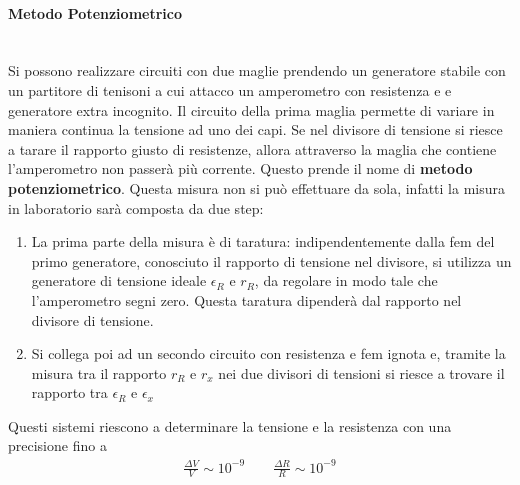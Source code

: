 \documentclass[a4paper, oneside]{article}
\begin{document}
\paragraph{Metodo Potenziometrico} \mbox{} \\
Si possono realizzare circuiti con due maglie prendendo un generatore stabile con 
un partitore di tenisoni a cui attacco un amperometro con resistenza e e generatore extra incognito.
Il circuito della prima maglia permette di variare in maniera continua la tensione 
ad uno dei capi. Se nel divisore di tensione si riesce a tarare il rapporto giusto di resistenze, allora
attraverso la maglia che contiene l'amperometro non passerà più corrente. Questo 
prende il nome di \textbf{metodo potenziometrico}. Questa misura non si può effettuare 
da sola, infatti la misura in laboratorio sarà composta da due step:
\begin{enumerate}
    \item  La prima parte della misura è di taratura: indipendentemente dalla
    fem del primo generatore, conosciuto il rapporto di tensione nel divisore, si utilizza
    un generatore di tensione ideale $\epsilon_R$ e $r_R$, da regolare in modo tale che l'amperometro segni zero.
    Questa taratura dipenderà dal rapporto nel divisore di tensione. 
    \item Si collega poi ad un secondo circuito con resistenza
    e fem ignota e, tramite la misura tra il rapporto $r_R$ e $r_x$ nei 
    due divisori di tensioni si riesce a trovare il rapporto tra $\epsilon_R$ e $\epsilon_x$
\end{enumerate}
Questi sistemi riescono a determinare la tensione e la resistenza con una precisione 
fino a
\begin{gather*}
    \frac{\Delta V}{V} \sim 10^{-9} \qquad \frac{\Delta R}{R} \sim 10^{-9}
\end{gather*}

\clearpage
\end{document}
